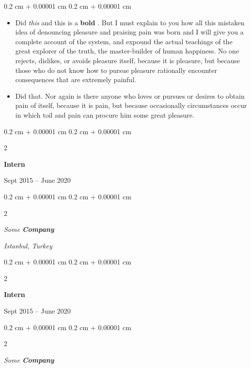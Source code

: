 \documentclass[10pt, letterpaper]{article}
\newenvironment{highlights}{
    \begin{itemize}[
        topsep=0.10 cm,
        parsep=0.10 cm,
        partopsep=0pt,
        itemsep=0pt,
        leftmargin=0.4 cm + 10pt
    ]
}{
    \end{itemize}
} %
\newenvironment{onecolentry}{
    \begin{adjustwidth}{
        0.2 cm + 0.00001 cm
    }{
        0.2 cm + 0.00001 cm
    }
}{
    \end{adjustwidth}
} %
\newenvironment{twocolentry}[2][]{
    \onecolentry
    \def\secondColumn{#2}
    \setcolumnwidth{\fill, 4.5 cm}
    \begin{paracol}{2}
}{
    \switchcolumn \raggedleft \secondColumn
    \end{paracol}
    \endonecolentry
} %
\let\hrefWithoutArrow\href
\renewcommand{\href}[2]{\hrefWithoutArrow{#1}{\ifthenelse{\equal{#2}{}}{ }{#2 }\raisebox{.15ex}{\footnotesize \faExternalLink*}}}
\begin{document}
        \vspace{0.10 cm}
        \begin{onecolentry}
            \begin{highlights}
                \item Did \textit{this} and this is a \textbf{bold} \href{https://example.com}{link}. But I must explain to you how all this mistaken idea of denouncing pleasure and praising pain was born and I will give you a complete account of the system, and expound the actual teachings of the great explorer of the truth, the master-builder of human happiness. No one rejects, dislikes, or avoids pleasure itself, because it is pleasure, but because those who do not know how to pursue pleasure rationally encounter consequences that are extremely painful.
                \item Did that. Nor again is there anyone who loves or pursues or desires to obtain pain of itself, because it is pain, but because occasionally circumstances occur in which toil and pain can procure him some great pleasure.
            \end{highlights}
        \end{onecolentry}


        \vspace{0.2 cm}

                \begin{twocolentry}{
                    Sept 2015 – June 2020
                }
                \textbf{Intern}
                \end{twocolentry}
            \begin{twocolentry}{
        \textit{Istanbul, Turkey}    }
            \textit{Some \textbf{Company}}
            \end{twocolentry}



        \vspace{0.2 cm}

                \begin{twocolentry}{
                    Sept 2015 – June 2020
                }
                \textbf{Intern}
                \end{twocolentry}
            \begin{twocolentry}{
            }
            \textit{Some \textbf{Company}}
            \end{twocolentry}



        \vspace{0.2 cm}
\end{document}
